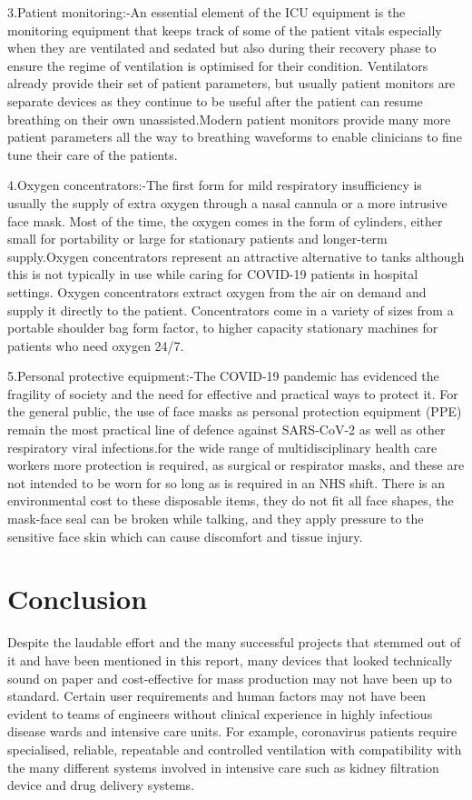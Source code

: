 \documentclass[12pt]{article}
\begin{document}
3.Patient monitoring:-An essential element of the ICU equipment is the monitoring equipment that keeps track of some of the patient vitals especially when they are ventilated and sedated but also during their recovery phase to ensure the regime of ventilation is optimised for their condition. Ventilators already provide their set of patient parameters, but usually patient monitors are separate devices as they continue to be useful after the patient can resume breathing on their own unassisted.Modern patient monitors provide many more patient parameters all the way to breathing waveforms to enable clinicians to fine tune their care of the patients.

4.Oxygen concentrators:-The first form for mild respiratory insufficiency is usually the supply of extra oxygen through a nasal cannula or a more intrusive face mask. Most of the time, the oxygen comes in the form of cylinders, either small for portability or large for stationary patients and longer-term supply.Oxygen concentrators represent an attractive alternative to tanks although this is not typically in use while caring for COVID-19 patients in hospital settings. Oxygen concentrators extract oxygen from the air on demand and supply it directly to the patient. Concentrators come in a variety of sizes from a portable shoulder bag form factor, to higher capacity stationary machines for patients who need oxygen 24/7.

5.Personal protective equipment:-The COVID-19 pandemic has evidenced the fragility of society and the need for effective and practical ways to protect it. For the general public, the use of face masks as personal protection equipment (PPE) remain the most practical line of defence against SARS-CoV-2 as well as other respiratory viral infections.for the wide range of multidisciplinary health care workers more protection is required, as surgical or respirator masks, and these are not intended to be worn for so long as is required in an NHS shift. There is an environmental cost to these disposable items, they do not fit all face shapes, the mask-face seal can be broken while talking, and they apply pressure to the sensitive face skin which can cause discomfort and tissue injury.

\section{Conclusion}
Despite the laudable effort and the many successful projects that stemmed out of it and have been mentioned in this report, many devices that looked technically sound on paper and cost-effective for mass production may not have been up to standard. Certain user requirements and human factors may not have been evident to teams of engineers without clinical experience in highly infectious disease wards and intensive care units. For example, coronavirus patients require specialised, reliable, repeatable and controlled ventilation with compatibility with the many different systems involved in intensive care such as kidney filtration device and drug delivery systems.
\end{document}
